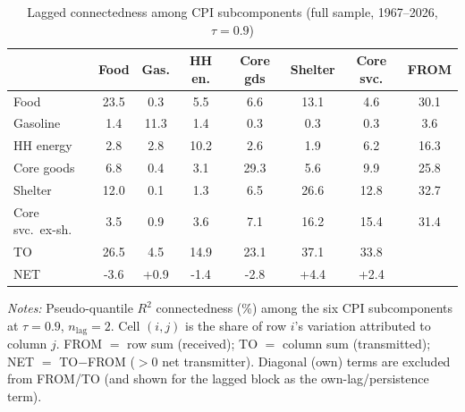 \begin{table}[!ht]
\centering
\caption{Lagged connectedness among CPI subcomponents (full sample, 1967--2026, $\tau=0.9$)}
\label{tab:connlfull}
\setlength{\tabcolsep}{4pt}\footnotesize
\begin{threeparttable}
\begin{tabular}{l c c c c c c c}
\toprule
 & Food & Gas. & HH en. & Core gds & Shelter & Core svc. & FROM \\
\midrule
Food & 23.5 & 0.3 & 5.5 & 6.6 & 13.1 & 4.6 & 30.1 \\
Gasoline & 1.4 & 11.3 & 1.4 & 0.3 & 0.3 & 0.3 & 3.6 \\
HH energy & 2.8 & 2.8 & 10.2 & 2.6 & 1.9 & 6.2 & 16.3 \\
Core goods & 6.8 & 0.4 & 3.1 & 29.3 & 5.6 & 9.9 & 25.8 \\
Shelter & 12.0 & 0.1 & 1.3 & 6.5 & 26.6 & 12.8 & 32.7 \\
Core svc.\ ex-sh. & 3.5 & 0.9 & 3.6 & 7.1 & 16.2 & 15.4 & 31.4 \\
\midrule
TO & 26.5 & 4.5 & 14.9 & 23.1 & 37.1 & 33.8 &  \\
NET & -3.6 & +0.9 & -1.4 & -2.8 & +4.4 & +2.4 &  \\
\bottomrule
\end{tabular}
\begin{tablenotes}[flushleft]\footnotesize
\item \textit{Notes:} Pseudo-quantile $R^2$ connectedness (\%) among the six CPI subcomponents at $\tau=0.9$, $n_{\text{lag}}=2$. Cell $(i,j)$ is the share of row $i$'s variation attributed to column $j$. FROM $=$ row sum (received); TO $=$ column sum (transmitted); NET $=$ TO$-$FROM ($>0$ net transmitter). Diagonal (own) terms are excluded from FROM/TO (and shown for the lagged block as the own-lag/persistence term).
\end{tablenotes}
\end{threeparttable}
\end{table}

